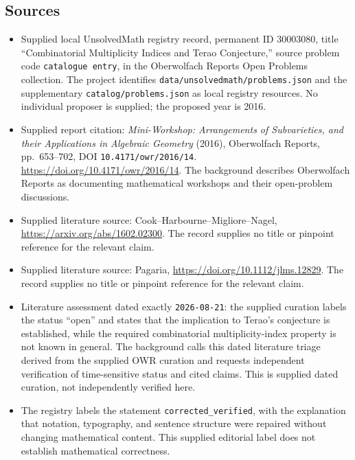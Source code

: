 \documentclass[11pt]{article}
\begin{document}
\subsection{Sources}
\begin{itemize}
\item Supplied local UnsolvedMath registry record, permanent ID \(30003080\), title ``Combinatorial Multiplicity Indices and Terao Conjecture,'' source problem code \texttt{catalogue entry}, in the Oberwolfach Reports Open Problems collection. The project identifies \texttt{data/unsolvedmath/problems.json} and the supplementary \texttt{catalog/problems.json} as local registry resources. No individual proposer is supplied; the proposed year is 2016.
\item Supplied report citation: \emph{Mini-Workshop: Arrangements of Subvarieties, and their Applications in Algebraic Geometry} (2016), Oberwolfach Reports, pp.~653--702, DOI \texttt{10.4171/owr/2016/14}. \url{https://doi.org/10.4171/owr/2016/14}. The background describes Oberwolfach Reports as documenting mathematical workshops and their open-problem discussions.
\item Supplied literature source: Cook--Harbourne--Migliore--Nagel, \url{https://arxiv.org/abs/1602.02300}. The record supplies no title or pinpoint reference for the relevant claim.
\item Supplied literature source: Pagaria, \url{https://doi.org/10.1112/jlms.12829}. The record supplies no title or pinpoint reference for the relevant claim.
\item Literature assessment dated exactly \texttt{2026-08-21}: the supplied curation labels the status ``open'' and states that the implication to Terao's conjecture is established, while the required combinatorial multiplicity-index property is not known in general. The background calls this dated literature triage derived from the supplied OWR curation and requests independent verification of time-sensitive status and cited claims. This is supplied dated curation, not independently verified here.
\item The registry labels the statement \texttt{corrected\_verified}, with the explanation that notation, typography, and sentence structure were repaired without changing mathematical content. This supplied editorial label does not establish mathematical correctness.
\end{itemize}
\end{document}
